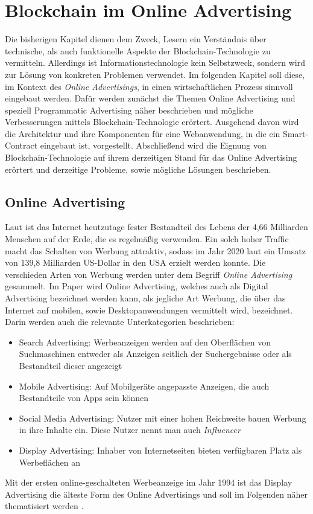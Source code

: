\chapter{Blockchain im Online Advertising}
Die bisherigen Kapitel dienen dem Zweck, Lesern ein Verständnis über technische, als auch funktionelle Aspekte der Blockchain-Technologie zu vermitteln. Allerdings ist Informationstechnologie kein Selbstzweck, sondern wird zur Lösung von konkreten Problemen verwendet.
Im folgenden Kapitel soll diese, im Kontext des \emph{Online Advertisings}, in einen wirtschaftlichen Prozess sinnvoll eingebaut werden. 
Dafür werden zunächst die Themen Online Advertising und speziell Programmatic Advertising näher beschrieben und mögliche Verbesserungen mittels Blockchain-Technologie erörtert. 
Ausgehend davon wird die Architektur und ihre Komponenten für eine Webanwendung, in die ein Smart-Contract eingebaut ist, vorgestellt. 
Abschließend wird die Eignung von Blockchain-Technologie auf ihrem derzeitigen Stand für das Online Advertising erörtert und derzeitige Probleme, sowie mögliche Lösungen beschrieben.
\section{Online Advertising}
Laut \cite{johnson_2021} ist das Internet heutzutage fester Bestandteil des Lebens der 4,66 Milliarden Menschen auf der Erde, die es regelmäßig verwenden. Ein solch hoher Traffic macht das Schalten von Werbung attraktiv, sodass im Jahr 2020 laut \cite{statista_online_advertisement_revenue_2021} ein Umsatz von 139,8 Milliarden US-Dollar in den USA erzielt werden konnte. Die verschieden Arten von Werbung werden unter dem Begriff \emph{Online Advertising} gesammelt.
Im Paper \cite{bundeskartellamt_2018} wird Online Advertising, welches auch als Digital Advertising bezeichnet werden kann, als jegliche Art Werbung, die über das Internet auf mobilen, sowie Desktopanwendungen vermittelt wird, bezeichnet. Darin werden auch die relevante Unterkategorien beschrieben: 
\begin{itemize}
	\item Search Advertising: Werbeanzeigen werden auf den Oberflächen von Suchmaschinen entweder als Anzeigen seitlich der Suchergebnisse oder als Bestandteil dieser angezeigt
	\item Mobile Advertising: Auf Mobilgeräte angepasste Anzeigen, die auch Bestandteile von Apps sein können
	\item Social Media Advertising:
	Nutzer mit einer hohen Reichweite bauen Werbung in ihre Inhalte ein. Diese Nutzer nennt man auch \emph{Influencer}
	\item Display Advertising: Inhaber von Internetseiten bieten verfügbaren Platz als Werbeflächen an
\end{itemize}
Mit der ersten online-geschalteten Werbeanzeige im Jahr 1994 ist das Display Advertising die älteste Form des Online Advertisings und soll im Folgenden näher thematisiert werden \cite{bundeskartellamt_2018}.
